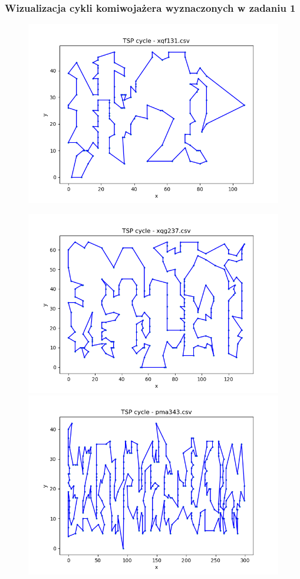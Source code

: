 \documentclass[12pt]{article}
\begin{document}
    \subsubsection*{Wizualizacja cykli komiwojażera wyznaczonych w zadaniu 1}

        \begin{figure}[h]
            \centering
            \includegraphics[width=0.74\linewidth]{img/xqf131.png}
            \label{fig:xqf131}
        \end{figure}

        \newpage

        \begin{figure}[h]
            \centering
            \includegraphics[width=0.8\linewidth]{img/xqg237.png}
            \label{fig:xqg237}
            \includegraphics[width=0.8\linewidth]{img/pma343.png}
            \label{fig:pma343}
        \end{figure}
\end{document}

